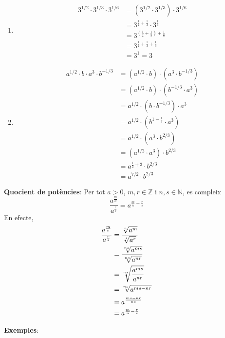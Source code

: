 \begin{enumerate}
\item[1.] 
\begin{align*}
3^{1/2}\cdot 3^{1/3}\cdot 3^{1/6} &=\left( 3^{1/2}\cdot 3^{1/3}\right)
\cdot 3^{1/6} \\
&=3^{\frac{1}{2}+\frac{1}{3}}\cdot 3^{\frac{1}{6}} \\
&=3^{\left( \frac{1}{2}+\frac{1}{3}\right) +\frac{1}{6}} \\
&=3^{\frac{1}{2}+\frac{1}{3}+\frac{1}{6}} \\
&=3^{1}=3
\end{align*}

\item[2.] 
\begin{align*}
a^{1/2}\cdot b\cdot a^{3}\cdot b^{-1/3} &=\left( a^{1/2}\cdot b\right)
\cdot \left( a^{3}\cdot b^{-1/3}\right) \\
&=\left( a^{1/2}\cdot b\right) \cdot \left( b^{-1/3}\cdot a^{3}\right) \\
&=a^{1/2}\cdot \left( b\cdot b^{-1/3}\right) \cdot a^{3} \\
&=a^{1/2}\cdot \left( b^{1-\frac{1}{3}}\cdot a^{3}\right) \\
&=a^{1/2}\cdot \left( a^{3}\cdot b^{2/3}\right) \\
&=\left( a^{1/2}\cdot a^{3}\right) \cdot b^{2/3} \\
&=a^{\frac{1}{2}+3}\cdot b^{2/3} \\
&=a^{7/2}\cdot b^{2/3}
\end{align*}
\end{enumerate}

\textbf{Quocient de potències}: Per tot $a>0$, $m,r\in \mathbb{Z}$ i $%
n,s\in \mathbb{N}$, es compleix%
\begin{equation*}
\frac{a^{\frac{m}{n}}}{a^{\frac{r}{s}}}=a^{\frac{m}{n}-\frac{r}{s}}
\end{equation*}%
En efecte,%
\begin{align*}
\frac{a^{\frac{m}{n}}}{a^{\frac{r}{s}}} &=\frac{\sqrt[n]{a^{m}}}{\sqrt[s]{%
a^{r}}} \\
&=\frac{\sqrt[ns]{a^{ms}}}{\sqrt[ns]{a^{nr}}} \\
&=\sqrt[ns]{\frac{a^{ms}}{a^{nr}}} \\
&=\sqrt[ns]{a^{ms-nr}} \\
&=a^{\frac{ms-nr}{ns}} \\
&=a^{\frac{m}{n}-\frac{r}{s}}
\end{align*}

\textbf{Exemples}:

